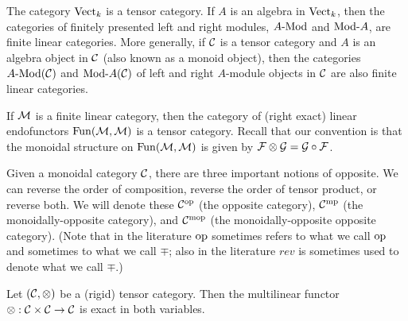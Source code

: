 \documentclass{amsart}
\begin{document}
\begin{example}
	The category $\mathrm{Vect}_k$ is a tensor category. If $A$ is an algebra in $\mathrm{Vect}_k$, then the categories of finitely presented left and right modules, $\Mod{A}{}$ and $\Mod{}{A}$, are finite linear categories. More generally, if $\mathcal C$ is a tensor category and $A$ is an algebra object in $\mathcal C$ (also known as a monoid object), then the categories $\Mod{A}{}(\cC)$ and $\Mod{}{A}(\cC)$ of left and right $A$-module objects in $\mathcal C$ are also finite linear categories.
\end{example}

\begin{example}
	If $\mathcal M$ is a finite linear category, then the category of (right exact) linear endofunctors $\operatorname{Fun}(\mathcal M, \mathcal M)$ is a tensor category.  Recall that our convention is that the monoidal structure on $\operatorname{Fun}(\mathcal M, \mathcal M)$ is given by $\mathcal F \otimes \mathcal G = \mathcal G \circ \mathcal F$.
\end{example}

Given a monoidal category $\mathcal C$, there are three important notions of opposite. We can reverse the order of composition, reverse the order of tensor product, or reverse both.  We will denote these $\mathcal C^{\mathrm{op}}$ (the opposite category), $\mathcal C^{\mathrm{mp}}$ (the monoidally-opposite category), and $\mathcal C^{\mathrm{mop}}$ (the monoidally-opposite opposite category).  (Note that in the literature $\mathrm{op}$ sometimes refers to what we call $\mathrm{op}$ and sometimes to what we call $\mp$; also in the literature $rev$ is sometimes used to denote what we call $\mp$.)


\begin{lemma} \label{lma:RigidIsExact}
	Let $(\mathcal C, \otimes)$ be a (rigid) tensor category. Then the multilinear functor $\otimes: \mathcal C \times \mathcal C \to \mathcal C$ is exact in both variables. 
\end{lemma}
\end{document}

